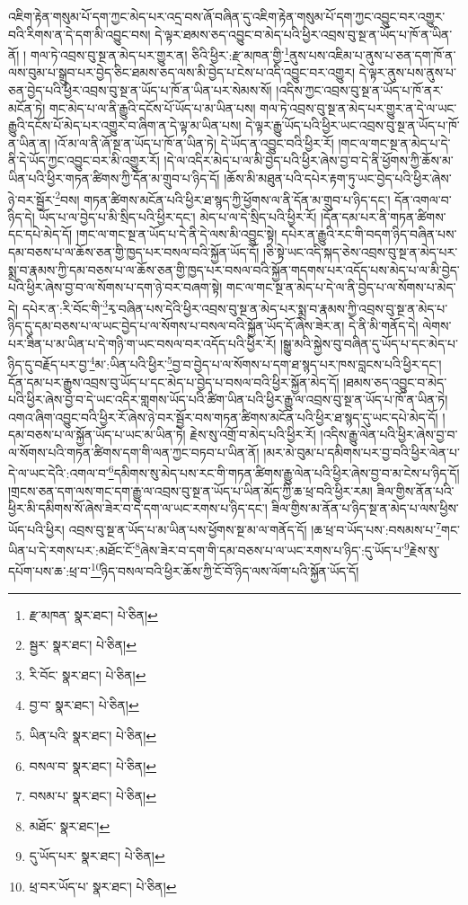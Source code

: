 འཇིག་རྟེན་གསུམ་པོ་དག་ཀྱང་མེད་པར་འདྲ་བས་ཞོ་བཞིན་དུ་འཇིག་རྟེན་གསུམ་པོ་དག་ཀྱང་འབྱུང་བར་འགྱུར་བའི་རིགས་ན་དེ་དག་མི་འབྱུང་བས། དེ་ལྟར་ཐམས་ཅད་འབྱུང་བ་མེད་པའི་ཕྱིར་འབྲས་བུ་སྔ་ན་ཡོད་པ་ཁོ་ན་ཡིན་ནོ། །
གལ་ཏེ་འབྲས་བུ་སྔ་ན་མེད་པར་གྱུར་ན། ཅིའི་ཕྱིར་:རྫ་མཁན་གྱི་\footnote{རྫ་མཁན་  སྣར་ཐང་།  པེ་ཅིན། }ནུས་པས་འཇིམ་པ་ནུས་པ་ཅན་དག་ཁོ་ན་ལས་བུམ་པ་སྒྲུབ་པར་བྱེད་ཅིང་ཐམས་ཅད་ལས་མི་བྱེད་པ་ངེས་པ་འདི་འབྱུང་བར་འགྱུར། དེ་ལྟར་ནུས་པས་ནུས་པ་ཅན་བྱེད་པའི་ཕྱིར་འབྲས་བུ་སྔ་ན་ཡོད་པ་ཁོ་ན་ཡིན་པར་སེམས་སོ། །འདིས་ཀྱང་འབྲས་བུ་སྔ་ན་ཡོད་པ་ཁོ་ནར་མངོན་ཏེ། གང་མེད་པ་ལ་ནི་རྒྱུའི་དངོས་པོ་ཡོད་པ་མ་ཡིན་པས། གལ་ཏེ་འབྲས་བུ་སྔ་ན་མེད་པར་གྱུར་ན་དེ་ལ་ཡང་རྒྱུའི་དངོས་པོ་མེད་པར་འགྱུར་བ་ཞིག་ན་དེ་ལྟ་མ་ཡིན་པས། དེ་ལྟར་རྒྱུ་ཡོད་པའི་ཕྱིར་ཡང་འབྲས་བུ་སྔ་ན་ཡོད་པ་ཁོ་ན་ཡིན་ན། །འོ་མ་ལ་ནི་ཞོ་སྔ་ན་ཡོད་པ་ཁོ་ན་ཡིན་ཏེ། དེ་ཡོད་ན་འབྱུང་བའི་ཕྱིར་རོ། །གང་ལ་གང་སྔ་ན་མེད་པ་དེ་ནི་དེ་ཡོད་ཀྱང་འབྱུང་བར་མི་འགྱུར་རོ། །དེ་ལ་འདིར་མེད་པ་ལ་མི་བྱེད་པའི་ཕྱིར་ཞེས་བྱ་བ་དེ་ནི་ཕྱོགས་ཀྱི་ཆོས་མ་ཡིན་པའི་ཕྱིར་གཏན་ཚིགས་ཀྱི་དོན་མ་གྲུབ་པ་ཉིད་དོ། །ཆོས་མི་མཐུན་པའི་དཔེར་རྟག་ཏུ་ཡང་བྱེད་པའི་ཕྱིར་ཞེས་ཉེ་བར་སྦྱོར་\footnote{སྦྱར་  སྣར་ཐང་།  པེ་ཅིན། }བས། གཏན་ཚིགས་མངོན་པའི་ཕྱིར་ཐ་སྙད་ཀྱི་ཕྱོགས་ལ་ནི་དོན་མ་གྲུབ་པ་ཉིད་དང་། དོན་འགལ་བ་ཉིད་དེ། ཡོད་པ་ལ་བྱེད་པ་མི་སྲིད་པའི་ཕྱིར་དང་། མེད་པ་ལ་དེ་སྲིད་པའི་ཕྱིར་རོ། །དོན་དམ་པར་ནི་གཏན་ཚིགས་དང་དཔེ་མེད་དོ། །གང་ལ་གང་སྔ་ན་ཡོད་པ་དེ་ནི་དེ་ལས་མི་འབྱུང་སྟེ། དཔེར་ན་རྒྱུའི་རང་གི་བདག་ཉིད་བཞིན་པས་དམ་བཅས་པ་ལ་ཆོས་ཅན་གྱི་ཁྱད་པར་བསལ་བའི་སྐྱོན་ཡོད་དོ། །ཅི་སྟེ་ཡང་འདི་སྐད་ཅེས་འབྲས་བུ་སྔ་ན་མེད་པར་སྨྲ་བ་རྣམས་ཀྱི་དམ་བཅས་པ་ལ་ཆོས་ཅན་གྱི་ཁྱད་པར་བསལ་བའི་སྐྱོན་གདགས་པར་འདོད་པས་མེད་པ་ལ་མི་བྱེད་པའི་ཕྱིར་ཞེས་བྱ་བ་ལ་སོགས་པ་དག་ཉེ་བར་བཞག་སྟེ། གང་ལ་གང་སྔ་ན་མེད་པ་དེ་ལ་ནི་བྱེད་པ་ལ་སོགས་པ་མེད་དེ། དཔེར་ན་:རི་བོང་གི་\footnote{རི་བོང་  སྣར་ཐང་།  པེ་ཅིན། }རྭ་བཞིན་པས་དེའི་ཕྱིར་འབྲས་བུ་སྔ་ན་མེད་པར་སྨྲ་བ་རྣམས་ཀྱི་འབྲས་བུ་སྔ་ན་མེད་པ་ཉིད་དུ་དམ་བཅས་པ་ལ་ཡང་བྱེད་པ་ལ་སོགས་པ་བསལ་བའི་སྐྱོན་ཡོད་དོ་ཞེས་ཟེར་ན། དེ་ནི་མི་གནོད་དེ། ལེགས་པར་ཟིན་པ་མ་ཡིན་པ་དེ་གཉི་ག་ཡང་བསལ་བར་འདོད་པའི་ཕྱིར་རོ། །སྒྱུ་མའི་སྐྱེས་བུ་བཞིན་དུ་ཡོད་པ་དང་མེད་པ་ཉིད་དུ་བརྗོད་པར་བྱ་\footnote{བྱ་བ་  སྣར་ཐང་།  པེ་ཅིན། }མ་:ཡིན་པའི་ཕྱིར་\footnote{ཡིན་པའི་  སྣར་ཐང་།  པེ་ཅིན། }བྱ་བ་བྱེད་པ་ལ་སོགས་པ་དག་ཐ་སྙད་པར་ཁས་བླངས་པའི་ཕྱིར་དང་། དོན་དམ་པར་རྒྱུས་འབྲས་བུ་ཡོད་པ་དང་མེད་པ་བྱེད་པ་བསལ་བའི་ཕྱིར་སྐྱོན་མེད་དོ། །ཐམས་ཅད་འབྱུང་བ་མེད་པའི་ཕྱིར་ཞེས་བྱ་བ་དེ་ཡང་འདིར་གླགས་ཡོད་པའི་ཚིག་ཡིན་པའི་ཕྱིར་རྒྱུ་ལ་འབྲས་བུ་སྔ་ན་ཡོད་པ་ཁོ་ན་ཡིན་ཏེ། འགའ་ཞིག་འབྱུང་བའི་ཕྱིར་རོ་ཞེས་ཉེ་བར་སྦྱོར་བས་གཏན་ཚིགས་མངོན་པའི་ཕྱིར་ཐ་སྙད་དུ་ཡང་དཔེ་མེད་དོ། །དམ་བཅས་པ་ལ་སྐྱོན་ཡོད་པ་ཡང་མ་ཡིན་ཏེ། རྗེས་སུ་འགྲོ་བ་མེད་པའི་ཕྱིར་རོ། །འདིས་རྒྱུ་ལེན་པའི་ཕྱིར་ཞེས་བྱ་བ་ལ་སོགས་པའི་གཏན་ཚིགས་དག་གི་ལན་ཀྱང་བཏབ་པ་ཡིན་ནོ། །མར་མེ་བུམ་པ་དམིགས་པར་བྱ་བའི་ཕྱིར་ལེན་པ་དེ་ལ་ཡང་དེའི་:འགལ་བ་\footnote{བསལ་བ་  སྣར་ཐང་།  པེ་ཅིན། }དམིགས་སུ་མེད་པས་རང་གི་གཏན་ཚིགས་རྒྱུ་ལེན་པའི་ཕྱིར་ཞེས་བྱ་བ་མ་ངེས་པ་ཉིད་དོ། །གྲངས་ཅན་དག་ལས་གང་དག་རྒྱུ་ལ་འབྲས་བུ་སྔ་ན་ཡོད་པ་ཡིན་མོད་ཀྱི་ཆ་ཕྲ་བའི་ཕྱིར་རམ། ཟིལ་གྱིས་ནོན་པའི་ཕྱིར་མི་དམིགས་སོ་ཞེས་ཟེར་བ་དེ་དག་ལ་ཡང་རགས་པ་ཉིད་དང་། ཟིལ་གྱིས་མ་ནོན་པ་ཉིད་སྔ་ན་མེད་པ་ལས་ཕྱིས་ཡོད་པའི་ཕྱིར། འབྲས་བུ་སྔ་ན་ཡོད་པ་མ་ཡིན་པས་ཕྱོགས་སྔ་མ་ལ་གནོད་དོ། །ཆ་ཕྲ་བ་ཡོད་པས་:བསམས་པ་\footnote{བསམ་པ་  སྣར་ཐང་།  པེ་ཅིན། }གང་ཡིན་པ་དེ་རགས་པར་:མཐོང་ངོ་\footnote{མཐོང་  སྣར་ཐང་། }ཞེས་ཟེར་བ་དག་གི་དམ་བཅས་པ་ལ་ཡང་རགས་པ་ཉིད་:དུ་ཡོད་པ་\footnote{དུ་ཡོད་པར་  སྣར་ཐང་།  པེ་ཅིན། }རྗེས་སུ་དཔོག་པས་ཆ་:ཕྲ་བ་\footnote{ཕྲ་བར་ཡོད་པ་  སྣར་ཐང་།  པེ་ཅིན། }ཉིད་བསལ་བའི་ཕྱིར་ཆོས་ཀྱི་ངོ་བོ་ཉིད་ལས་ལོག་པའི་སྐྱོན་ཡོད་དོ། 